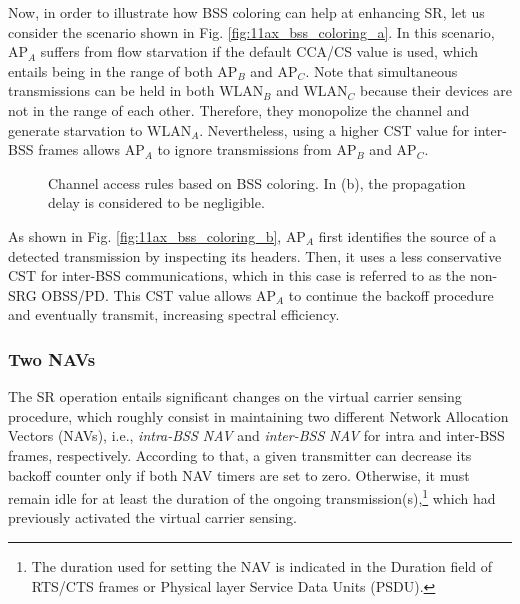 \documentclass[preprint,12pt]{elsarticle}
\begin{document}
	Now, in order to illustrate how BSS coloring can help at enhancing SR, let us consider the scenario shown in Fig. \ref{fig:11ax_bss_coloring_a}. In this scenario, $\text{AP}_{A}$ suffers from flow starvation if the default CCA/CS value is used, which entails being in the range of both $\text{AP}_B$ and $\text{AP}_C$. Note that simultaneous transmissions can be held in both $\text{WLAN}_B$ and $\text{WLAN}_C$ because their devices are not in the range of each other. Therefore, they monopolize the channel and generate starvation to $\text{WLAN}_A$. Nevertheless, using a higher CST value for inter-BSS frames allows $\text{AP}_{A}$ to ignore transmissions from $\text{AP}_B$ and $\text{AP}_C$. 
	
	\begin{figure}[ht!]
		\centering
		\hspace{1cm}
		\caption{Channel access rules based on BSS coloring. In (b), the propagation delay is considered to be negligible.}
	\end{figure}
	
	As shown in Fig. \ref{fig:11ax_bss_coloring_b}, $\text{AP}_A$ first identifies the source of a detected transmission by inspecting its headers. Then, it uses a less conservative CST for inter-BSS communications, which in this case is referred to as the non-SRG OBSS/PD. This CST value allows $\text{AP}_A$ to continue the backoff procedure and eventually transmit, increasing spectral efficiency.
	
	\subsubsection{Two NAVs}
	\label{section:two_navs}
	The SR operation entails significant changes on the virtual carrier sensing procedure, which roughly consist in maintaining two different Network Allocation Vectors (NAVs), i.e., \emph{intra-BSS NAV} and \emph{inter-BSS NAV} for intra and inter-BSS frames, respectively. According to that, a given transmitter can decrease its backoff counter only if both NAV timers are set to zero. Otherwise, it must remain idle for at least the duration of the ongoing transmission(s),\footnote{The duration used for setting the NAV is indicated in the Duration field of RTS/CTS frames or Physical layer Service Data Units (PSDU).} which had previously activated the virtual carrier sensing. 
	
\end{document}
